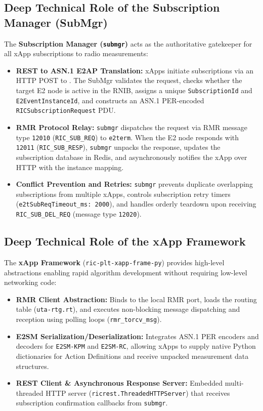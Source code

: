 \documentclass[11pt,a4paper]{article}
\begin{document}
\subsection{Deep Technical Role of the Subscription Manager (SubMgr)}
The \textbf{Subscription Manager (\texttt{submgr})} acts as the authoritative gatekeeper for all xApp subscriptions to radio measurements:
\begin{itemize}
    \item \textbf{REST to ASN.1 E2AP Translation:} xApps initiate subscriptions via an HTTP POST to . The SubMgr validates the request, checks whether the target E2 node is active in the RNIB, assigns a unique \texttt{SubscriptionId} and \texttt{E2EventInstanceId}, and constructs an ASN.1 PER-encoded \texttt{RICSubscriptionRequest} PDU.
    \item \textbf{RMR Protocol Relay:} \texttt{submgr} dispatches the request via RMR message type \texttt{12010} (\texttt{RIC\_SUB\_REQ}) to \texttt{e2term}. When the E2 node responds with \texttt{12011} (\texttt{RIC\_SUB\_RESP}), \texttt{submgr} unpacks the response, updates the subscription database in Redis, and asynchronously notifies the xApp over HTTP with the instance mapping.
    \item \textbf{Conflict Prevention and Retries:} \texttt{submgr} prevents duplicate overlapping subscriptions from multiple xApps, controls subscription retry timers (\texttt{e2tSubReqTimeout\_ms: 2000}), and handles orderly teardown upon receiving \texttt{RIC\_SUB\_DEL\_REQ} (message type \texttt{12020}).
\end{itemize}

\subsection{Deep Technical Role of the xApp Framework}
The \textbf{xApp Framework} (\texttt{ric-plt-xapp-frame-py}) provides high-level abstractions enabling rapid algorithm development without requiring low-level networking code:
\begin{itemize}
    \item \textbf{RMR Client Abstraction:} Binds to the local RMR port, loads the routing table (\texttt{uta-rtg.rt}), and executes non-blocking message dispatching and reception using polling loops (\texttt{rmr\_torcv\_msg}).
    \item \textbf{E2SM Serialization/Deserialization:} Integrates ASN.1 PER encoders and decoders for \texttt{E2SM-KPM} and \texttt{E2SM-RC}, allowing xApps to supply native Python dictionaries for Action Definitions and receive unpacked measurement data structures.
    \item \textbf{REST Client \& Asynchronous Response Server:} Embedded multi-threaded HTTP server (\texttt{ricrest.ThreadedHTTPServer}) that receives subscription confirmation callbacks from \texttt{submgr}.
\end{itemize}
\end{document}
